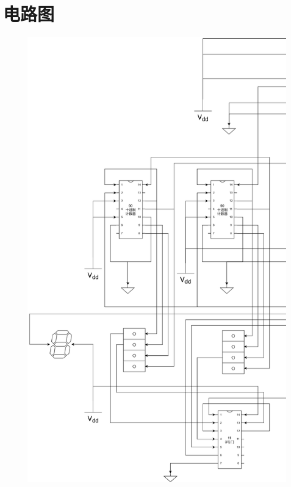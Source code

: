 \documentclass[a4paper]{article}
\begin{document}
\section{电路图}

\begin{figure}[H]
    \centering
    \includegraphics[width=0.8\linewidth]{figures/g1}
\end{figure}
\end{document}
